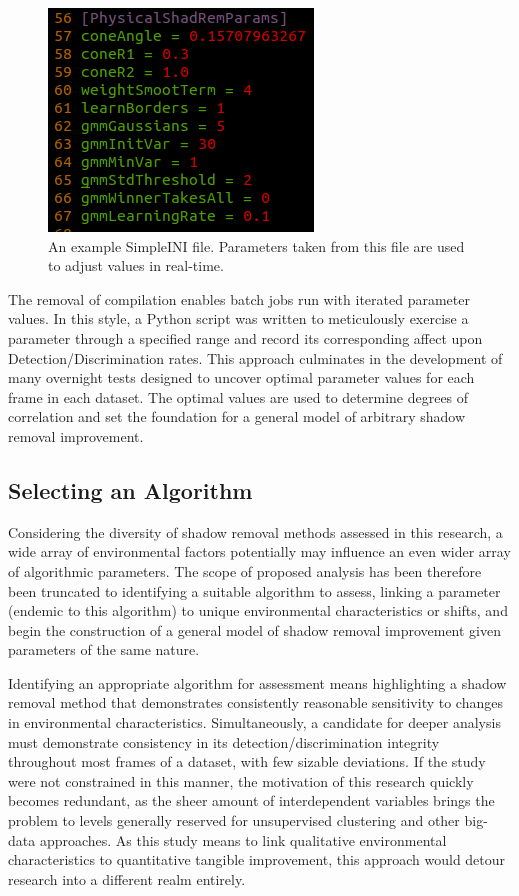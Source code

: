 \documentclass[12pt]{report}
\begin{document}
\begin{figure}
  \centering
  \includegraphics[width=.5\linewidth]{figures/simpleini.png}
  \caption{An example SimpleINI file. Parameters taken from this file are used to adjust values in real-time.}
  \label{fig:simpleini}
\end{figure}

The removal of compilation enables batch jobs run with iterated parameter values. In this style, a Python script was written to meticulously exercise a parameter through a specified range and record its corresponding affect upon Detection/Discrimination rates. This approach culminates in the development of many overnight tests designed to uncover optimal parameter values for each frame in each dataset. The optimal values are used to determine degrees of correlation and set the foundation for a general model of arbitrary shadow removal improvement.

\subsection{Selecting an Algorithm}

Considering the diversity of shadow removal methods assessed in this research, a wide array of environmental factors potentially may influence an even wider array of algorithmic parameters. The scope of proposed analysis has been therefore been truncated to identifying a suitable algorithm to assess, linking a parameter (endemic to this algorithm) to unique environmental characteristics or shifts, and begin the construction of a general model of shadow removal improvement given parameters of the same nature.

Identifying an appropriate algorithm for assessment means highlighting a shadow removal method that demonstrates consistently reasonable sensitivity to changes in environmental characteristics. Simultaneously, a candidate for deeper analysis must demonstrate consistency in its detection/discrimination integrity throughout most frames of a dataset, with few sizable deviations. If the study were not constrained in this manner, the motivation of this research quickly becomes redundant, as the sheer amount of interdependent variables brings the problem to levels generally reserved for unsupervised clustering and other big-data approaches. As this study means to link qualitative environmental characteristics to quantitative tangible improvement, this approach would detour research into a different realm entirely.
\end{document}

